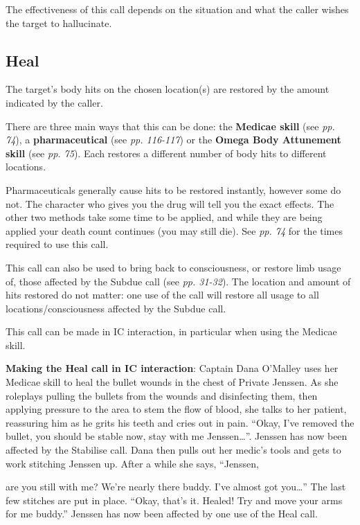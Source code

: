 The effectiveness of this call depends on the situation and what the caller wishes the target to hallucinate.

\subsection{Heal}

The target's body hits on the chosen location(s) are restored by the amount indicated by the caller.

There are three main ways that this can be done: the \textbf{Medicae skill} (see \textit{pp. 74}), a \textbf{pharmaceutical} (see \textit{pp. 116-117}) or the \textbf{Omega Body Attunement skill} (see \textit{pp. 75}). Each restores a different number of body hits to different locations.

Pharmaceuticals generally cause hits to be restored instantly, however some do not. The character who gives you the drug will tell you the exact effects. The other two methods take some time to be applied, and while they are being applied your death count continues (you may still die). See \textit{pp. 74} for the times required to use this call.

This call can also be used to bring back to consciousness, or restore limb usage of, those affected by the Subdue call (see \textit{pp. 31-32}). The location and amount of hits restored do not matter: one use of the call will restore all usage to all locations/consciousness affected by the Subdue call.

This call can be made in IC interaction, in particular when using the Medicae skill.

\textbf{Making the Heal call in IC interaction}: Captain Dana O'Malley uses her Medicae skill to heal the bullet wounds in the chest of Private Jenssen. As she roleplays pulling the bullets from the wounds and disinfecting them, then applying pressure to the area to stem the flow of blood, she talks to her patient, reassuring him as he grits his teeth and cries out in pain. ``Okay, I've removed the bullet, you should be stable now, stay with me Jenssen{\dots}''. Jenssen has now been affected by the Stabilise call. Dana then pulls out her medic's tools and gets to work stitching Jenssen up. After a while she says, ``Jenssen,

are you still with me? We're nearly there buddy. I've almost got you{\dots}'' The last few stitches are put in place. ``Okay, that's it. Healed! Try and move your arms for me buddy.'' Jenssen has now been affected by one use of the Heal call.

